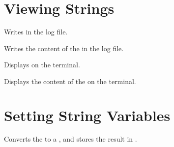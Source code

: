 \documentclass[oneside]{book}
\begin{document}
\section{Viewing Strings}

\begin{function}{\StrLog}
\begin{syntax}
 
\end{syntax}
Writes  in the log file.
\begin{codehigh}
\end{codehigh}
\end{function}

\begin{function}{\StrVarLog}
\begin{syntax}
 
\end{syntax}
Writes the content of the  in the log file.
\begin{codehigh}
\StrSet {}
\StrVarLog \lTmpiStr
\end{codehigh}
\end{function}

\begin{function}{\StrShow}
\begin{syntax}
 
\end{syntax}
Displays  on the terminal.
\begin{codehigh}
\end{codehigh}
\end{function}

\begin{function}{\StrVarShow}
\begin{syntax}
 
\end{syntax}
Displays the content of the  on the terminal.
\begin{codehigh}
\StrSet {}
\StrVarShow \lTmpiStr
\end{codehigh}
\end{function}

\section{Setting String Variables}

\begin{function}{\StrSet}
\begin{syntax}
  
\end{syntax}
Converts the  to a , and stores the
result in .
\begin{demohigh}
\StrSet {}
\StrUse \lTmpiStr
\end{demohigh}
\end{function}
\end{document}
